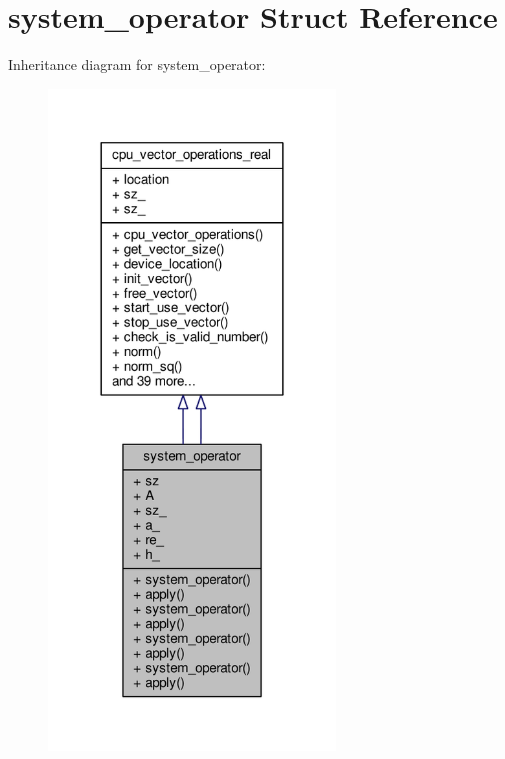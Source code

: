 \hypertarget{structsystem__operator}{\section{system\-\_\-operator Struct Reference}
\label{structsystem__operator}
}


Inheritance diagram for system\-\_\-operator\-:
\nopagebreak
\begin{figure}[H]
\begin{center}
\leavevmode
\includegraphics[width=216pt]{structsystem__operator__inherit__graph}
\end{center}
\end{figure}


